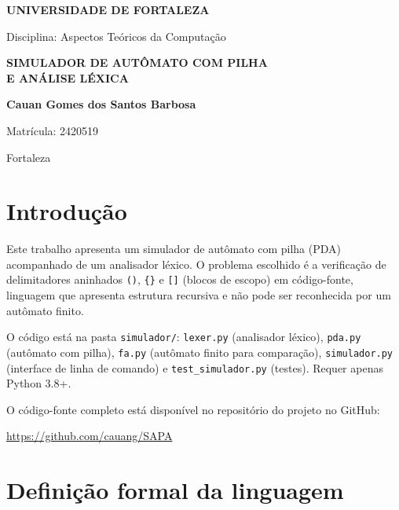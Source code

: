 \documentclass[12pt,a4paper]{article}
\begin{document}
\begin{titlepage}
\thispagestyle{empty}
\centering
\singlespacing
{\bfseries\large UNIVERSIDADE DE FORTALEZA}\par
\vspace{0.4cm}
Disciplina: Aspectos Teóricos da Computação\par
{}
{\bfseries\Large SIMULADOR DE AUTÔMATO COM PILHA\\E ANÁLISE LÉXICA\par}
\raggedright
\textbf{Cauan Gomes dos Santos Barbosa}\par
Matrícula: 2420519\par
\vspace{2cm}
\centering
Fortaleza\par
\the\year\par
\end{titlepage}

\pagestyle{fancy}
\tableofcontents
\newpage

\section*{Introdução}

Este trabalho apresenta um simulador de autômato com pilha (PDA) acompanhado de um analisador léxico. O problema escolhido é a verificação de delimitadores aninhados \texttt{()}, \texttt{\{\}} e \texttt{[]} (blocos de escopo) em código-fonte, linguagem que apresenta estrutura recursiva e não pode ser reconhecida por um autômato finito.

O código está na pasta \texttt{simulador/}: \texttt{lexer.py} (analisador léxico), \texttt{pda.py} (autômato com pilha), \texttt{fa.py} (autômato finito para comparação), \texttt{simulador.py} (interface de linha de comando) e \texttt{test\_simulador.py} (testes). Requer apenas Python 3.8+.

O código-fonte completo está disponível no repositório do projeto no GitHub:

\begin{center}
\url{https://github.com/cauang/SAPA}
\end{center}

\newpage

\section{Definição formal da linguagem}
\end{document}
